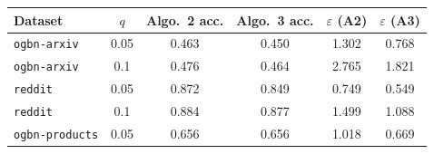 \begin{tabular}{lccccc}
\toprule
Dataset & $q$ & Algo.~2 acc. & Algo.~3 acc. & $\varepsilon$ (A2) & $\varepsilon$ (A3) \\
\midrule
\texttt{ogbn-arxiv} & 0.05 & 0.463 & 0.450 & 1.302 & 0.768 \\
\texttt{ogbn-arxiv} & 0.1 & 0.476 & 0.464 & 2.765 & 1.821 \\
\texttt{reddit} & 0.05 & 0.872 & 0.849 & 0.749 & 0.549 \\
\texttt{reddit} & 0.1 & 0.884 & 0.877 & 1.499 & 1.088 \\
\texttt{ogbn-products} & 0.05 & 0.656 & 0.656 & 1.018 & 0.669 \\
\bottomrule
\end{tabular}
